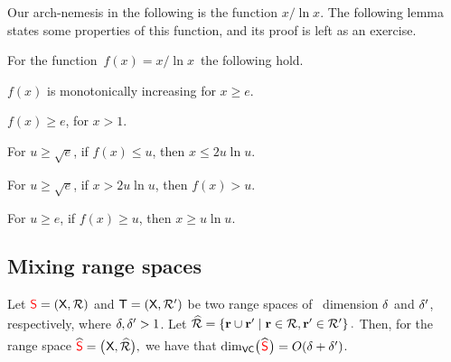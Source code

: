 Our arch-nemesis in the following is the function $x / \ln x$. The
following lemma states some properties of this function, and its proof
is left as an exercise.


\begin{lemma}
    For the function $\,f(x) = x / \ln x\,$ the following hold.
    \begin{compactenumA}
        \item $f(x)$ is monotonically increasing for $x \geq e$.
        \item $f(x) \geq e$, for $x >1$.
        \item For $u \geq \sqrt{e}$, if $f(x) \leq u$, then $x \leq 2
        u \ln u$.
        \item For $u \geq \sqrt{e}$, if $x > 2 u \ln u$, then $f(x) >
        u$.
        \label{nemesis:function:part:D}
        
        \item For $u \geq e$, if $f(x) \geq u$, then $x \geq u \ln u$.
    \end{compactenumA}
\end{lemma}



\subsection{Mixing range spaces}


\begin{lemma}
    Let ${\textcolor{red}{\mathsf{S}}} = (\textsf{X},{\mathcal{R}})$ and
    $\mathsf{T} = (\textsf{X},\mathcal{R}')$ be two range spaces of
    ~\VC dimension $\delta$ and $\delta'$, respectively, where
    $\delta, \delta' > 1$. Let
    \begin{math}
        \Bigl.  \widehat{\RangeSet}%
        =%
        \Set{\range \cup \rangeA}{ \range \in \RangeSet, \rangeA \in
           \RangeSetA}.
    \end{math}
      Then, for the range
    space
    \begin{math}
        \widehat{{\textcolor{red}{\mathsf{S}}}} = \bigl( \hspace{0.6pt} \textsf{X},
        \widehat{{\mathcal{R}}} \bigr),
    \end{math}
     we have that
    $\mathrm{dim}_{\mathsf{VC}}\bigl( \hspace{0.6pt} \widehat{{\textcolor{red}{\mathsf{S}}}} \hspace{0.6pt} \bigr)=O(\delta +
    \delta')$.
\end{lemma}

